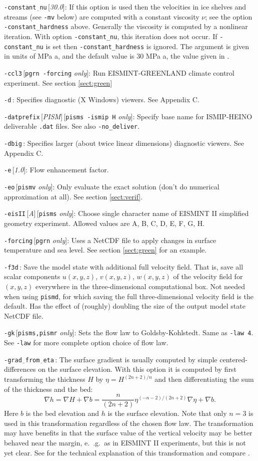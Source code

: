 \documentclass[11pt,final]{amsart}
\newcommand{\grad}{\nabla}
\newcommand{\rawopt}[1]{\vspace{1mm}\noindent \large\texttt{-#1}\normalsize}
\newcommand{\opt}[1]{\rawopt{#1}\,:\quad}
\newcommand{\optdef}[2]{\rawopt{#1}\,[\textsl{#2}]:\quad}
\newcommand{\optrestrict}[2]{\rawopt{#1}\,[\texttt{#2} \textsl{only}]:\quad}
\newcommand{\optdefrestrict}[3]{\rawopt{#1}\,[\textsl{#2}]\,[\texttt{#3} \textsl{only}]:\quad}
\newcommand{\und}{$\underline{\,\,\,}$}
\begin{document}
\optdef{constant\und nu}{30.0}  If this option is used then the velocities in ice shelves and streams (see \verb|-mv| below) are computed with a constant viscosity $\nu$; see the option \verb|-constant_hardness| above.  Generally the viscosity is computed by a nonlinear iteration.  With option \verb|-constant_nu|, this iteration does not occur.  If \verb|-constant_nu| is set then \verb|-constant_hardness| is ignored.  The argument is given in units of MPa a, and the default value is $30$ MPa a, the value given in \cite{Ritzetal2001}.

\optrestrict{ccl3}{pgrn -forcing}    Run EISMINT-GREENLAND climate control experiment. See section \ref{sect:green}

\opt{d}  Specifies diagnostic (X Windows) viewers.  See Appendix C.

\optdefrestrict{datprefix}{PISM}{pisms -ismip H}  Specify base name for ISMIP-HEINO deliverable \verb|.dat| files.  See also \verb|-no_deliver|.

\opt{dbig}  Specifies larger (about twice linear dimensions) diagnostic viewers.  See Appendix C.

\optdef{e}{1.0}  Flow enhancement factor.

\optrestrict{eo}{pismv}  Only evaluate the exact solution (don't do numerical approximation at all).  See section \ref{sect:verif}.

\optdefrestrict{eisII}{A}{pisms}  Choose single character name of EISMINT II \cite{EISMINT00} simplified geometry experiment.  Allowed values are A, B, C, D, E, F, G, H.

\optrestrict{forcing}{pgrn}    Uses a NetCDF file to apply changes in surface temperature and sea level. See section \ref{sect:green} for an example.

\opt{f3d}  Save the model state with additional full velocity field.  That is, save all scalar components $u(x,y,z)$, $v(x,y,z)$, $w(x,y,z)$ of the velocity field for $(x,y,z)$ everywhere in the three-dimensional computational box.  Not needed when using \verb|pismd|, for which saving the full three-dimensional velocity field is the default.  Has the effect of (roughly) doubling the size of the output model state NetCDF file.

\optrestrict{gk}{pisms,pismr}  Sets the flow law to Goldsby-Kohlstedt.  Same as \verb|-law 4|.  See \verb|-law| for more complete option choice of flow law.

\opt{grad\und from\und eta}  The surface gradient is usually computed by simple centered-differences on the surface elevation.  With this option it is computed by first transforming the thickness $H$ by $\eta = H^{(2n+2)/n}$ and then differentiating the sum of the thickness and the bed:
	$$\grad h = \grad H + \grad b = \frac{n}{(2n+2)} \eta^{(-n-2)/(2n+2)} \nabla \eta + \nabla b.$$
Here $b$ is the bed elevation and $h$ is the surface elevation.  Note that only $n=3$ is used in this transformation regardless of the chosen flow law.  The transformation may have benefits in that the surface value of the vertical velocity may be better behaved near the margin, e.~.g.~as in EISMINT II experiments, but this is not yet clear.  See \cite{CDDSV} for the technical explanation of this transformation and compare \cite{SaitoMargin}.
\end{document}
